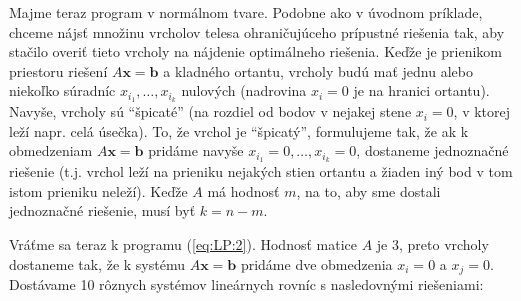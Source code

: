 \noindent Majme teraz program v normálnom tvare. Podobne ako v úvodnom
príklade, chceme nájsť množinu vrcholov telesa \dom ohraničujúceho prípustné
riešenia tak, aby stačilo overiť tieto vrcholy na nájdenie optimálneho riešenia.
Keďže \dom je prienikom priestoru riešení $A\bm{x}=\bm{b}$ a kladného ortantu,
vrcholy budú mať jednu alebo niekoľko súradníc $x_{i_1},\ldots,x_{i_k}$ nulových
(nadrovina $x_i=0$ je na hranici ortantu).  Navyše, vrcholy sú ``špicaté'' (na
rozdiel od bodov v nejakej stene $x_i=0$, v ktorej leží napr. celá úsečka).
To, že vrchol je ``špicatý'', formulujeme tak, že ak k obmedzeniam  $A\bm{x}=\bm{b}$
pridáme navyše $x_{i_1}=0,\ldots,x_{i_k}=0$, dostaneme jednoznačné riešenie
(t.j. vrchol leží na prieniku nejakých stien ortantu a žiaden iný bod v tom istom
prieniku neleží).  Keďže $A$ má hodnosť $m$, na to, aby sme dostali jednoznačné
riešenie, musí byť $k=n-m$. 

\noindent Vráťme sa teraz k programu (\ref{eq:LP:2}).  Hodnosť matice $A$ je 3,
preto vrcholy dostaneme tak, že k systému $A\bm{x}=\bm{b}$ pridáme dve obmedzenia
$x_i=0$ a $x_j=0$.  Dostávame 10 rôznych systémov lineárnych rovníc s
nasledovnými riešeniami:

